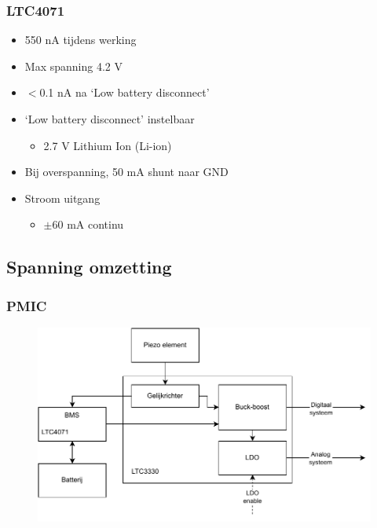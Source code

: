     \begin{frame}
        \frametitle{LTC4071}
        \begin{itemize}
            \item 550 nA tijdens werking
            \item Max spanning 4.2 V
            \item $<$0.1 nA na `Low battery disconnect'
            \item `Low battery disconnect' instelbaar
                \begin{itemize}
                    \item 2.7 V Lithium Ion (Li-ion)
                \end{itemize}
            \item Bij overspanning, 50 mA shunt naar GND
            \item Stroom uitgang
                \begin{itemize}
                    \item $\pm 60$ mA continu 
                \end{itemize}
        \end{itemize}

    \end{frame}

    \subsection{Spanning omzetting}

    \begin{frame}
        \frametitle{PMIC}
        \begin{figure}[h]
            \centering
            \includegraphics[scale=0.6]{img/energie_systeem.pdf}
        \end{figure}
    \end{frame}
    
